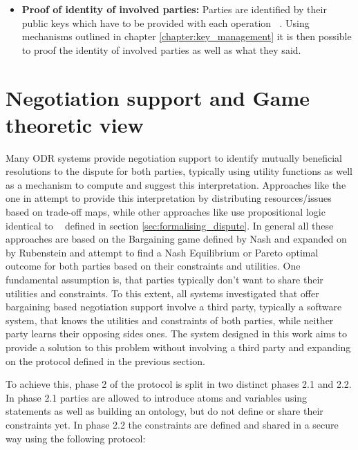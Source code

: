 \documentclass[12pt,msc,a4paper,oneside]{ucl_thesis}
\DeclareMathOperator{\metaop}{\mathcal{o}_m}
\DeclareMathOperator{\Proplang}{\mathcal{L}(N)}
\begin{document}
\begin{itemize}
    \item{\textbf{Proof of identity of involved parties:}} Parties are identified by their public keys which have to be provided with each operation $\metaop$. Using mechanisms outlined in chapter \ref{chapter:key_management} it is then possible to proof the identity of involved parties as well as what they said.

\end{itemize}


\section{Negotiation support and Game theoretic view} \label{sec:negotiation_support}
Many ODR systems provide negotiation support to identify mutually beneficial resolutions to the dispute for both parties, typically using utility functions as well as a mechanism to compute and suggest this interpretation. Approaches like the one in \cite{Bellucci:2004:IAI:1032651.1033678} attempt to provide this interpretation by distributing resources/issues based on trade-off maps, while other approaches like \cite{Ragone:2006:PAO:1124566.1124569} use propositional logic identical to $\Proplang$ defined in section \ref{sec:formalising_dispute}. In general all these approaches are based on the Bargaining game defined by Nash \cite{Nash:bargaining} and expanded on by Rubenstein \cite{Rubenstein} and attempt to find a Nash Equilibrium or Pareto optimal outcome for both parties based on their constraints and utilities. 
One fundamental assumption is, that parties typically don't want to share their utilities and constraints. To this extent, all systems investigated that offer bargaining based negotiation support involve a third party, typically a software system, that knows the utilities and constraints of both parties, while neither party learns their opposing sides ones. The system designed in this work aims to provide a solution to this problem without involving a third party and expanding on the protocol defined in the previous section.


To achieve this, phase 2 of the protocol is split in two distinct phases 2.1 and 2.2. In phase 2.1 parties are allowed to introduce atoms and variables using statements as well as building an ontology, but do not define or share their constraints yet. In phase 2.2 the constraints are defined and shared in a secure way using the following protocol:
\end{document}
